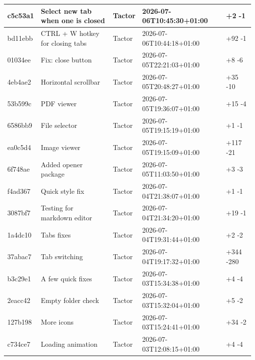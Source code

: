 \documentclass[11pt,a4paper]{full-example-report}
\begin{document}
\begin{table}[h]
\begin{tabularx}{\textwidth}{lllll}
c5c53a1 & Select new tab when one is closed & Tactor & 2026-07-06T10:45:30+01:00 & \textcolor{insertion}{+2} \textcolor{deletion}{-1} \\ \hline
bd11ebb & CTRL + W hotkey for closing tabs & Tactor & 2026-07-06T10:44:18+01:00 & \textcolor{insertion}{+92} \textcolor{deletion}{-1} \\ \hline
01034ee & Fix: close button & Tactor & 2026-07-05T22:21:03+01:00 & \textcolor{insertion}{+8} \textcolor{deletion}{-6} \\ \hline
4eb4ae2 & Horizontal scrollbar & Tactor & 2026-07-05T20:48:27+01:00 & \textcolor{insertion}{+35} \textcolor{deletion}{-10} \\ \hline
53b599c & PDF viewer & Tactor & 2026-07-05T19:36:07+01:00 & \textcolor{insertion}{+15} \textcolor{deletion}{-4} \\ \hline
6586bb9 & File selector & Tactor & 2026-07-05T19:15:19+01:00 & \textcolor{insertion}{+1} \textcolor{deletion}{-1} \\ \hline
ea0c5d4 & Image viewer & Tactor & 2026-07-05T19:15:09+01:00 & \textcolor{insertion}{+117} \textcolor{deletion}{-21} \\ \hline
6f748ae & Added opener package & Tactor & 2026-07-05T11:03:50+01:00 & \textcolor{insertion}{+3} \textcolor{deletion}{-3} \\ \hline
f4ad367 & Quick style fix & Tactor & 2026-07-04T21:38:07+01:00 & \textcolor{insertion}{+1} \textcolor{deletion}{-1} \\ \hline
3087bf7 & Testing for markdown editor & Tactor & 2026-07-04T21:34:20+01:00 & \textcolor{insertion}{+19} \textcolor{deletion}{-1} \\ \hline
1a4dc10 & Tabs fixes & Tactor & 2026-07-04T19:31:44+01:00 & \textcolor{insertion}{+2} \textcolor{deletion}{-2} \\ \hline
37abac7 & Tab switching & Tactor & 2026-07-04T19:17:32+01:00 & \textcolor{insertion}{+344} \textcolor{deletion}{-280} \\ \hline
b3c29e1 & A few quick fixes & Tactor & 2026-07-03T15:34:38+01:00 & \textcolor{insertion}{+4} \textcolor{deletion}{-4} \\ \hline
2eacc42 & Empty folder check & Tactor & 2026-07-03T15:32:04+01:00 & \textcolor{insertion}{+5} \textcolor{deletion}{-2} \\ \hline
127b198 & More icons & Tactor & 2026-07-03T15:24:41+01:00 & \textcolor{insertion}{+34} \textcolor{deletion}{-2} \\ \hline
c734ce7 & Loading animation & Tactor & 2026-07-03T12:08:15+01:00 & \textcolor{insertion}{+4} \textcolor{deletion}{-4} \\ \hline

\end{tabularx}
\end{table}
\end{document}
